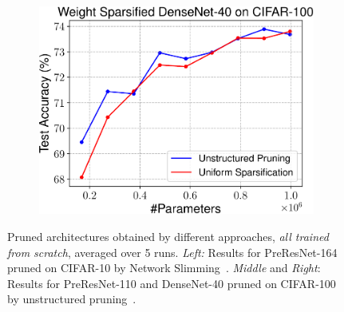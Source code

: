 \begin{figure}[!ht]
\begin{minipage}{.325\textwidth}
\begin{subfigure}{\textwidth}
 \end{subfigure}
\end{minipage}
\begin{minipage}{.325\textwidth}
 \begin{subfigure}{\textwidth}
 \centering
\includegraphics[width=\textwidth]{figures/weight-level-densenet-40-cifar100-crop.pdf}
 \end{subfigure}
\end{minipage}
    \vspace{-1ex}
    \caption{
      Pruned architectures obtained by different approaches, \emph{all trained from scratch}, averaged over 5 runs. \emph{Left:} Results for PreResNet-164 pruned on CIFAR-10 by Network Slimming~\citep{liu2017learning}. \emph{Middle} and \emph{Right}: Results for PreResNet-110 and DenseNet-40 pruned on CIFAR-100 by unstructured pruning~\citep{han2015learning}. 
    }
    \label{arch-search-negative}
\end{figure}

